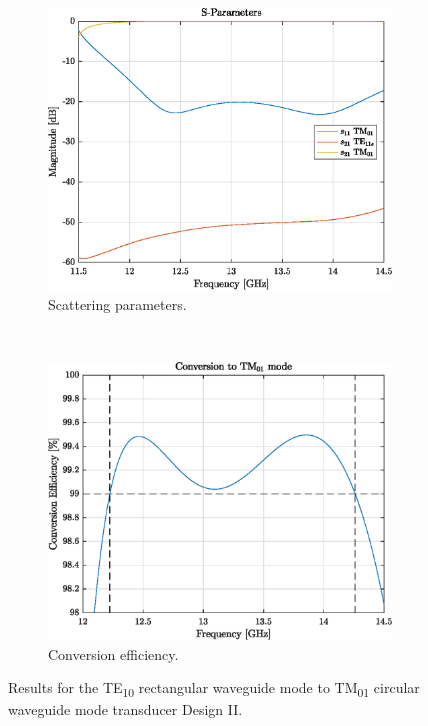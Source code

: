 \documentclass[english,twoside]{article}
\begin{document}
		\begin{figure}[H]
			\centering			
			\begin{subfigure}[b]{0.48\textwidth}
				\includegraphics[width=\textwidth]{figures/wrToWcTM01}
				\caption{Scattering parameters.}
			\end{subfigure}
			~
			\begin{subfigure}[b]{0.48\textwidth}
				\includegraphics[width=\textwidth]{figures/wrToWcTM01_eff}
				\caption{Conversion efficiency.}
			\end{subfigure}
			\caption{Results for the TE\textsubscript{10} rectangular waveguide mode to TM\textsubscript{01} circular waveguide mode transducer Design II.}
			\label{fig:wrToWcTM01}
		\end{figure}
	
\end{document}
